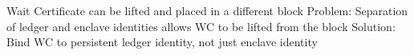 \documentclass{article}
\begin{document}
Wait Certificate can be lifted and placed in a different block
Problem: Separation of ledger and enclave identities allows WC to be lifted from the block
Solution: Bind WC to persistent ledger identity, not just enclave identity







\begin{thebibliography}{9}
\end{thebibliography}
\end{document}
